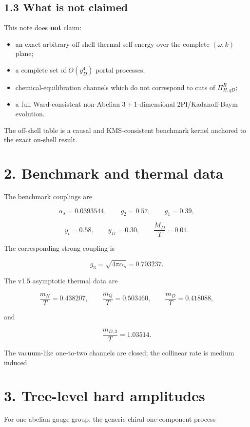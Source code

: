 \documentclass[
  10pt,
]{article}
\providecommand{\tightlist}{%
  \setlength{\itemsep}{0pt}\setlength{\parskip}{0pt}}
\begin{document}
\subsection{1.3 What is not claimed}\label{what-is-not-claimed}

This note does \textbf{not} claim:

\begin{itemize}
\tightlist
\item
  an exact arbitrary-off-shell thermal self-energy over the complete
  \((\omega,k)\) plane;
\item
  a complete set of \(O(y_D^4)\) portal processes;
\item
  chemical-equilibration channels which do not correspond to cuts of
  \(\Pi_{H,qD}^R\);
\item
  a full Ward-consistent non-Abelian \(3+1\)-dimensional
  2PI/Kadanoff-Baym evolution.
\end{itemize}

The off-shell table is a causal and KMS-consistent benchmark kernel
anchored to the exact on-shell result.

\section{2. Benchmark and thermal
data}\label{benchmark-and-thermal-data}

The benchmark couplings are

\[
\alpha_s=0.0393544,
\qquad
g_2=0.57,
\qquad
g_1=0.39,
\]

\[
y_t=0.58,
\qquad
y_D=0.30,
\qquad
\frac{M_D}{T}=0.01.
\]

The corresponding strong coupling is

\[
g_3=\sqrt{4\pi\alpha_s}=0.703237.
\]

The v1.5 asymptotic thermal data are

\[
\frac{m_H}{T}=0.438207,
\qquad
\frac{m_Q}{T}=0.503460,
\qquad
\frac{m_D}{T}=0.418088,
\]

and

\[
\frac{m_{D,3}}{T}=1.03514.
\]

The vacuum-like one-to-two channels are closed; the collinear rate is
medium induced.

\section{3. Tree-level hard
amplitudes}\label{tree-level-hard-amplitudes}

For one abelian gauge group, the generic chiral one-component process
\end{document}
